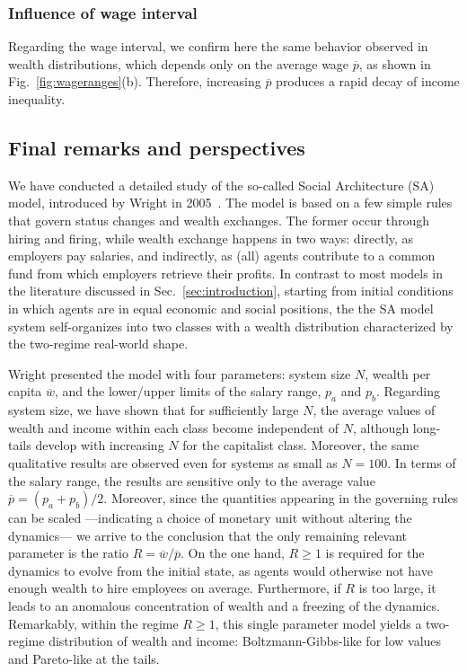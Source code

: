 \subsubsection*{Influence of  wage interval}

Regarding the wage interval, we confirm here the same behavior observed in wealth distributions, which depends only on the average wage $\overline{p}$, as shown in Fig.~\ref{fig:wageranges}(b).
%
Therefore,  increasing $\overline{p}$ produces a rapid decay of income inequality.  


\subsection{Final remarks and perspectives}
\label{sec:final}
We have conducted a detailed study of the so-called Social Architecture (SA) model, introduced by Wright in 2005~\cite{WRIGHT2005589}.
The model is based on a few simple rules that govern status changes and wealth exchanges. 
The former occur through hiring and firing, while wealth exchange happens in two ways: directly, as employers pay salaries, and indirectly, as (all) agents contribute to a common fund from which employers retrieve their profits.  In contrast to most models in the literature discussed in Sec.~\ref{sec:introduction}, starting from initial conditions in which agents are in  equal economic and social positions, the the SA model system self-organizes into two classes with a wealth distribution characterized by the two-regime real-world shape. 

Wright presented the model with four parameters: system size $N$, wealth per capita $\overline{w}$, and the lower/upper limits of the salary range, $p_a$ and $p_b$.  
Regarding system size, we have shown that for sufficiently large $N$, the average values of wealth and income within each class become independent of $N$, although long-tails develop with increasing $N$ for the capitalist class. Moreover,  the same qualitative results are observed even for systems as small as $N=100$. 
In terms of the salary range, the results are sensitive only to the average value $\overline p = (p_a+p_b)/2$.
%
Moreover, since the quantities appearing in the governing rules can be scaled ---indicating a choice of monetary unit without altering the dynamics--- we arrive to the conclusion that the only remaining relevant parameter is the ratio $R=\overline{w}/\overline{p}$. On the one hand, $R\geq1$ is required for the dynamics to evolve from the initial state, as agents would otherwise not have enough wealth to hire employees on average. Furthermore, if $R$ is too large, it leads to an anomalous concentration of wealth and a freezing of the dynamics. Remarkably, within the regime $R\geq1$, this single parameter model yields a two-regime distribution of wealth and income: Boltzmann-Gibbs-like for low values and Pareto-like at the tails.

